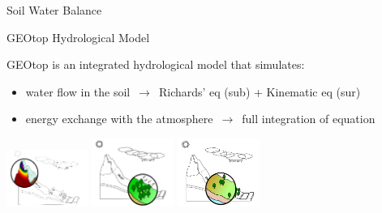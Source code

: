 \documentclass[ignorenonframetext,]{beamer}
\begin{document}
\begin{frame}{Soil Water Balance}

\end{frame}

\begin{frame}{GEOtop Hydrological Model}

GEOtop is an integrated hydrological model that simulates:

\begin{itemize}
\item water flow in the soil $\,\to\,$ Richards' eq (sub) + Kinematic eq (sur)
\item energy exchange with the atmosphere $\,\to\,$ full integration of equation
\end{itemize}

\includegraphics[width=0.20000\textwidth]{resources/images/geotop_snow.png}
\includegraphics[width=0.20000\textwidth]{resources/images/geotop_vegetation.png}
\includegraphics[width=0.20000\textwidth]{resources/images/geotop_infiltration.png}

\end{frame}
\end{document}
